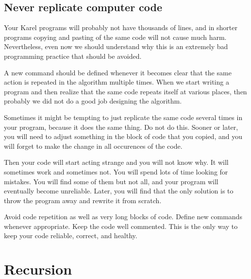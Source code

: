 \subsection{Never replicate computer code}

Your Karel programs will probably not have thousands of lines, 
and in shorter programs copying and pasting of the same code 
will not cause much harm. Nevertheless, even now we should 
understand why this is an extremely bad programming practice
that should be avoided. 

A new command should be defined whenever it becomes clear that the same 
action is repeated in the algorithm multiple times. When we start writing a program and then realize that the same
code repeats itself at various places, then probably we did not do a good job 
designing the algorithm.

Sometimes it might be tempting to just replicate the same code several 
times in your program, because it does the same thing. Do not do this.
Sooner or later, you will need to adjust something in the block of 
code that you copied, and you will forget to make the change in all
occurences of the code. 

Then your code will start acting strange and you will not know why.
It will sometimes work and sometimes not. You will spend lots of time 
looking for mistakes. You will find some of them but not all, and your 
program will eventually become unreliable. Later, you will find that 
the only solution is to throw the program away and rewrite it from scratch.\\

\begin{gbox}
\begin{center}
Avoid code repetition as well as very long blocks of code. Define new commands whenever 
appropriate. Keep the code well commented. This is the only way to keep your code 
reliable, correct, and healthy.  
\end{center}
\end{gbox}
\vspace{4mm}

\noindent


\section{Recursion} \label{sec:recursion}

